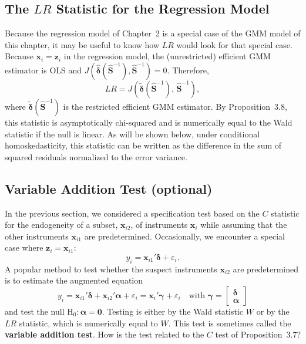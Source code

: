 \subsection*{The $LR$ Statistic for the Regression Model}

Because the regression model of Chapter~2 is a special case of the GMM model
of this chapter, it may be useful to know how $LR$ would look for that special case.
Because $\mathbf{x}_i = \mathbf{z}_i$ in the regression model, the (unrestricted) efficient GMM estimator
is OLS and $J(\hat{\boldsymbol{\delta}}(\hat{\mathbf{S}}^{-1}), \hat{\mathbf{S}}^{-1}) = 0$.
Therefore,
\begin{equation}
  LR = J(\tilde{\boldsymbol{\delta}}(\hat{\mathbf{S}}^{-1}),\, \hat{\mathbf{S}}^{-1}),
  \label{eq:3.7.3}
\end{equation}
where $\tilde{\boldsymbol{\delta}}(\hat{\mathbf{S}}^{-1})$ is the restricted efficient GMM estimator.
By Proposition~3.8, this statistic is asymptotically chi-squared and is numerically equal
to the Wald statistic if the null is linear.  As will be shown below, under conditional
homoskedasticity, this statistic can be written as the difference in the sum of squared
residuals normalized to the error variance.

\subsection*{Variable Addition Test (optional)}

In the previous section, we considered a specification test based on the $C$ statistic
for the endogeneity of a subset, $\mathbf{x}_{i2}$, of instruments $\mathbf{x}_i$ while assuming that the
other instruments $\mathbf{x}_{i1}$ are predetermined.  Occasionally, we encounter a special case
where $\mathbf{z}_i = \mathbf{x}_{i1}$:
\begin{equation}
  y_i = \mathbf{x}_{i1}' \boldsymbol{\delta} + \varepsilon_i.
  \label{eq:3.7.4}
\end{equation}
A popular method to test whether the suspect instruments $\mathbf{x}_{i2}$ are predetermined is
to estimate the augmented equation
\begin{equation}
  y_i = \mathbf{x}_{i1}' \boldsymbol{\delta}
  + \mathbf{x}_{i2}' \boldsymbol{\alpha} + \varepsilon_i
  = \mathbf{x}_i' \boldsymbol{\gamma} + \varepsilon_i
  \quad \text{with } \boldsymbol{\gamma}
  = \begin{bmatrix} \boldsymbol{\delta} \\ \boldsymbol{\alpha} \end{bmatrix}
  \label{eq:3.7.5}
\end{equation}
and test the null $\mathrm{H}_0\colon \boldsymbol{\alpha} = \mathbf{0}$.  Testing is either by the Wald
statistic $W$ or by the $LR$ statistic, which is numerically equal to $W$.  This test is
sometimes called the \textbf{variable addition test}.  How is the test related to the $C$ test
of Proposition~3.7?

